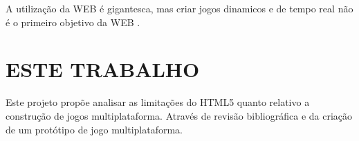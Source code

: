 A utilização da WEB é gigantesca, mas criar jogos dinamicos e de tempo real não é o primeiro objetivo da WEB \autocite{html5mostwanted}.

\section{ESTE TRABALHO}

Este projeto propõe analisar as limitações do HTML5 quanto relativo
a construção de jogos multiplataforma. Através de revisão
bibliográfica e da criação de um protótipo de jogo multiplataforma.



